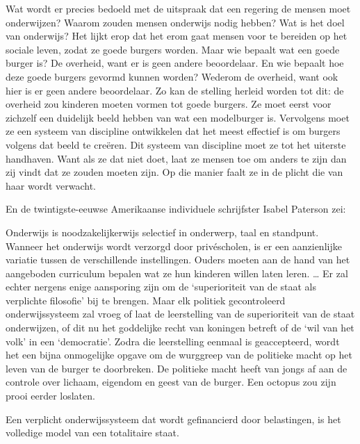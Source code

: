 \documentclass[
  a5paper,
  smalldemyvopaper,10pt,twoside,onecolumn,openright,extrafontsizes,hidelinks]{memoir}
\renewenvironment{quote}%
               {\list{}{\rightmargin=.6cm\leftmargin=.6cm}%
                \itshape \item[]}%
               {\endlist}
\begin{document}
\begin{quote}
Wat wordt er precies bedoeld met de uitspraak dat een regering de mensen
moet onderwijzen? Waarom zouden mensen onderwijs nodig hebben? Wat is
het doel van onderwijs? Het lijkt erop dat het erom gaat mensen voor te
bereiden op het sociale leven, zodat ze goede burgers worden. Maar wie
bepaalt wat een goede burger is? De overheid, want er is geen andere
beoordelaar. En wie bepaalt hoe deze goede burgers gevormd kunnen
worden? Wederom de overheid, want ook hier is er geen andere
beoordelaar. Zo kan de stelling herleid worden tot dit: de overheid zou
kinderen moeten vormen tot goede burgers. Ze moet eerst voor zichzelf
een duidelijk beeld hebben van wat een modelburger is. Vervolgens moet
ze een systeem van discipline ontwikkelen dat het meest effectief is om
burgers volgens dat beeld te creëren. Dit systeem van discipline moet ze
tot het uiterste handhaven. Want als ze dat niet doet, laat ze mensen
toe om anders te zijn dan zij vindt dat ze zouden moeten zijn. Op die
manier faalt ze in de plicht die van haar wordt verwacht.
\end{quote}

En de twintigste-eeuwse Amerikaanse individuele schrijfster Isabel
Paterson zei:

\begin{quote}
Onderwijs is noodzakelijkerwijs selectief in onderwerp, taal en
standpunt. Wanneer het onderwijs wordt verzorgd door privéscholen, is er
een aanzienlijke variatie tussen de verschillende instellingen. Ouders
moeten aan de hand van het aangeboden curriculum bepalen wat ze hun
kinderen willen laten leren. \ldots{} Er zal echter nergens enige
aansporing zijn om de `superioriteit van de staat als verplichte
filosofie' bij te brengen. Maar elk politiek gecontroleerd
onderwijssysteem zal vroeg of laat de leerstelling van de superioriteit
van de staat onderwijzen, of dit nu het goddelijke recht van koningen
betreft of de `wil van het volk' in een `democratie'. Zodra die
leerstelling eenmaal is geaccepteerd, wordt het een bijna onmogelijke
opgave om de wurggreep van de politieke macht op het leven van de burger
te doorbreken. De politieke macht heeft van jongs af aan de controle
over lichaam, eigendom en geest van de burger. Een octopus zou zijn
prooi eerder loslaten.

Een verplicht onderwijssysteem dat wordt gefinancierd door belastingen,
is het volledige model van een totalitaire staat.
\end{quote}
\end{document}

